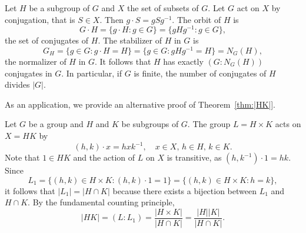 \begin{example}
    Let $H$ be a subgroup of $G$ and $X$ the set of subsets of $G$. Let $G$ act on 
    $X$ by conjugation, that is $S\in X$. Then
        $g\cdot S=gSg^{-1}$. The orbit of $H$ 
        is 
        \[
        G\cdot H=\{g\cdot H:g\in G\}=\{gHg^{-1}:g\in G\},
        \]
        the set of conjugates of $H$. The stabilizer of $H$ in $G$ 
        is 
        \[
        G_H=\{g\in G:g\cdot H=H\}=\{g\in G:gHg^{-1}=H\}=N_G(H),
        \]
        the normalizer of $H$ in $G$. It follows that
        $H$ has exactly $(G:N_G(H))$ conjugates in $G$. In particular,
        if $G$ is finite, 
        the number of conjugates of $H$ divides $|G|$. 
\end{example}

As an application, we provide an alternative proof
of Theorem~\ref{thm:|HK|}. 

\begin{example}
\label{exa:for_HK}
Let $G$ be a group and $H$ and $K$ be subgroups of $G$. 
The group $L=H\times K$ acts on $X=HK$ by 
\[
(h,k)\cdot x=hxk^{-1},\quad x\in X,\,h\in H,\,k\in K.
\]
Note that $1\in HK$ and the action of $L$ on $X$ is transitive, as 
$(h,k^{-1})\cdot 1 = hk$. Since 
\[
L_1=\{(h,k)\in H\times K: (h,k)\cdot 1=1\}=\{(h,k)\in H\times K:h=k\},
\]
it follows that $|L_1|=|H\cap K|$ because there exists a bijection
between $L_1$ and 
$H\cap K$. By the fundamental counting principle, 
\[
|HK|=(L:L_1)=\frac{|H\times K|}{|H\cap K|}=\frac{|H||K|}{|H\cap K|}.
\]
\end{example}
